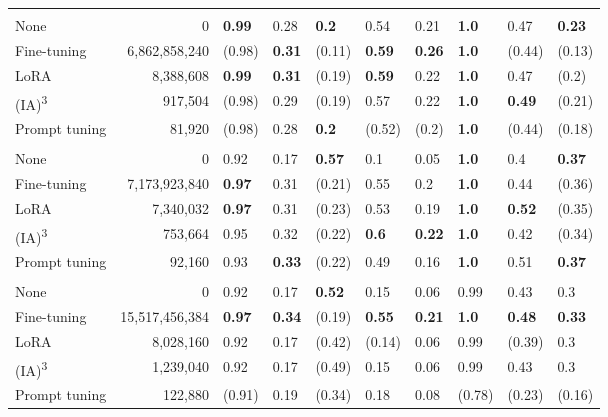 \begin{table*}[htbp]
\begin{threeparttable}
\begin{tabularx}{\textwidth}{lr!{\color{white}\hspace{.5em}}YYYYY!{\color{white}\hspace{1em}}YYY}
         \bigstrut \\*
        None & 0 & \textbf{0.99} & 0.28 & \textbf{0.2} & 0.54 & 0.21 & \textbf{1.0} & 0.47 & \textbf{0.23} \\
        Fine-tuning & 6,862,858,240 & (0.98) & \textbf{0.31} & (0.11) & \textbf{0.59} & \textbf{0.26} & \textbf{1.0} & (0.44) & (0.13) \\
        LoRA & 8,388,608 & \textbf{0.99} & \textbf{0.31} & (0.19) & \textbf{0.59} & 0.22 & \textbf{1.0} & 0.47 & (0.2) \\
        (IA)\textsuperscript{3} & 917,504 & (0.98) & 0.29 & (0.19) & 0.57 & 0.22 & \textbf{1.0} & \textbf{0.49} & (0.21) \\
        Prompt tuning & 81,920 & (0.98) & 0.28 & \textbf{0.2} & (0.52) & (0.2) & \textbf{1.0} & (0.44) & (0.18) \\

         \bigstrut \\*
        None & 0 & 0.92 & 0.17 & \textbf{0.57} & 0.1 & 0.05 & \textbf{1.0} & 0.4 & \textbf{0.37} \\
        Fine-tuning & 7,173,923,840 & \textbf{0.97} & 0.31 & (0.21) & 0.55 & 0.2 & \textbf{1.0} & 0.44 & (0.36) \\
        LoRA & 7,340,032 & \textbf{0.97} & 0.31 & (0.23) & 0.53 & 0.19 & \textbf{1.0} & \textbf{0.52} & (0.35) \\
        (IA)\textsuperscript{3} & 753,664 & 0.95 & 0.32 & (0.22) & \textbf{0.6} & \textbf{0.22} & \textbf{1.0} & 0.42 & (0.34) \\
        Prompt tuning & 92,160 & 0.93 & \textbf{0.33} & (0.22) & 0.49 & 0.16 & \textbf{1.0} & 0.51 & \textbf{0.37} \\

         \bigstrut \\*
        None & 0 & 0.92 & 0.17 & \textbf{0.52} & 0.15 & 0.06 & 0.99 & 0.43 & 0.3 \\
        Fine-tuning & 15,517,456,384 & \textbf{0.97} & \textbf{0.34} & (0.19) & \textbf{0.55} & \textbf{0.21} & \textbf{1.0} & \textbf{0.48} & \textbf{0.33} \\
        LoRA & 8,028,160 & 0.92 & 0.17 & (0.42) & (0.14) & 0.06 & 0.99 & (0.39) & 0.3 \\
        (IA)\textsuperscript{3} & 1,239,040 & 0.92 & 0.17 & (0.49) & 0.15 & 0.06 & 0.99 & 0.43 & 0.3 \\
        Prompt tuning & 122,880 & (0.91) & 0.19 & (0.34) & 0.18 & 0.08 & (0.78) & (0.23) & (0.16) \\


\end{tabularx}
\end{threeparttable}
\end{table*}
